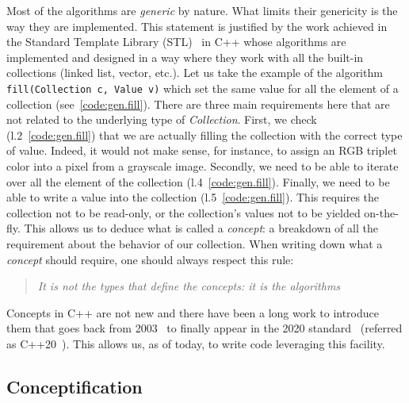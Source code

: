 Most of the algorithms are \emph{generic} by nature. What limits their genericity is the way they are implemented. This
statement is justified by the work achieved in the Standard Template Library (STL)~\parencite{dehnert.1998.fundamentals}
in C++ whose algorithms are implemented and designed in a way where they work with all the built-in collections (linked
list, vector, etc.). Let us take the example of the algorithm \texttt{fill(Collection c, Value v)} which set the same
value for all the element of a collection (see~\cref{code:gen.fill}). There are three main requirements here that are not
related to the underlying type of \emph{Collection}. First, we check (l.2~\ref{code:gen.fill}) that we are actually
filling the collection with the correct type of value. Indeed, it would not make sense, for instance, to assign an RGB
triplet color into a pixel from a grayscale image. Secondly, we need to be able to iterate over all the element of the
collection (l.4~\ref{code:gen.fill}). Finally, we need to be able to write a value into the collection
(l.5~\ref{code:gen.fill}). This requires the collection not to be read-only, or the collection's values not to be yielded
on-the-fly. This allows us to deduce what is called a \emph{concept}: a breakdown of all the requirement about the
behavior of our collection. When writing down what a \emph{concept} should require, one should always respect this rule:
\blockquote{\emph{It is not the types that define the concepts: it is the algorithms}}. Concepts in C++ are not new and
there have been a long work to introduce them that goes back from
2003~\parencite{seymour.2009.concepts,stroustrup.2003.concepts,sutton.2017.concepts} to finally appear in the 2020
standard~\cite{voutilainen.2017.concepts} (referred as C++20~\parencite{iso.2011.cpp}). This allows us, as of today, to
write code leveraging this facility.

\subsection{Conceptification}
\label{subsec:conceptification}

